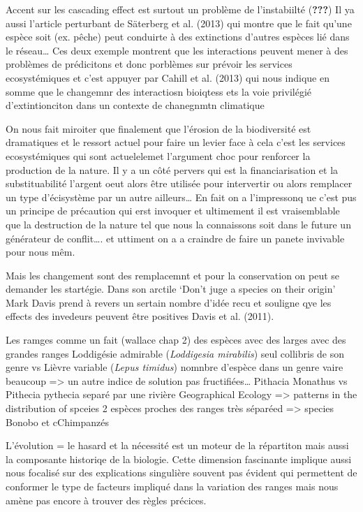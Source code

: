 Accent sur les cascading effect est surtout un problème de l'instabiilté
({\textbf{???}}) Il ya aussi l'article perturbant de Säterberg et al.
(2013) qui montre que le fait qu'une espèce soit (ex. pêche) peut
conduirte à des extinctions d'autres espèces lié dans le réseau\ldots{}
Ces deux exemple montrent que les interactions peuvent mener à des
problèmes de prédicitons et donc porblèmes sur prévoir les services
ecosystémiques et c'est appuyer par Cahill et al. (2013) qui nous
indique en somme que le changemnr des interactiosn bioiqtess ets la voie
privilégié d'extintionciton dans un contexte de chanegnmtn climatique

On nous fait miroiter que finalement que l'érosion de la biodiversité
est dramatiques et le ressort actuel pour faire un levier face à cela
c'est les services ecosystémiques qui sont actuelelemet l'argument choc
pour renforcer la production de la nature. Il y a un côté pervers qui
est la financiarisation et la substituabilité l'argent oeut alors être
utilisée pour intervertir ou alors remplacer un type d'écisystème par un
autre ailleurs\ldots{} En fait on a l'impressonq ue c'est pus un
principe de précaution qui erst invoquer et ultimement il est
vraisemblable que la destruction de la nature tel que nous la
connaissons soit dans le future un générateur de conflit\ldots{}. et
uttiment on a a craindre de faire un panete invivable pour nous mêm.

Mais les changement sont des remplacemnt et pour la conservation on peut
se demander les startégie. Dans son arctile `Don't juge a species on
their origin' Mark Davis prend à revers un sertain nombre d'idée recu et
souligne qye les effects des invedeurs peuvent être positives Davis et
al. (2011).

Les ramges comme un fait (wallace chap 2) des espèces avec des larges
avec des grandes ranges Loddigésie admirable (\emph{Loddigesia
mirabilis}) seul collibris de son genre vs Lièvre variable (\emph{Lepus
timidus}) nomnbre d'espèce dans un genre vaire beaucoup =\textgreater{}
un autre indice de solution pas fructifiées\ldots{} Pithacia Monathus vs
Pithecia pythecia separé par une rivière Geographical Ecology
=\textgreater{} patterns in the distribution of spceies 2 espèces
proches des ranges très séparéed =\textgreater{} species Bonobo et
cChimpanzés

L'évolution = le hasard et la nécessité est un moteur de la répartiton
mais aussi la composante historiqe de la biologie. Cette dimension
fascinante implique aussi nous focalisé sur des explications singulière
souvent pas évident qui permettent de conformer le type de facteurs
impliqué dans la variation des ranges mais nous amène pas encore à
trouver des règles précices.

